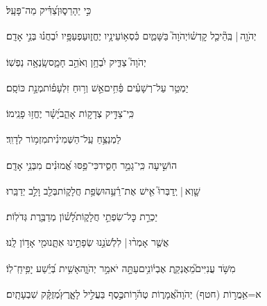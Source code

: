 \documentclass[12pt]{article}
\newcommand{\loc}[1]{\textsuperscript{\locf{#1}}}
\begin{document}
{\loc{ ג}~}‏כִּ֣י  יֵהָרֵס֑וּן{\hfill}צַ֝דִּ֗יק מַה־פָּעָֽל׃\par

{\loc{ ד}~}‏יְהֹוָ֤ה |  בְּֽהֵ֘יכַ֤ל קׇדְשׁ֗וֹ{\hfill}יְהֹוָה֮ בַּשָּׁמַ֢יִם כִּ֫סְא֥וֹ\newline\hspace*{.5em}עֵינָ֥יו יֶחֱז֑וּ{\hfill}עַפְעַפָּ֥יו יִ֝בְחֲנ֗וּ בְּנֵ֣י אָדָֽם׃\par

{\loc{ ה}~}‏יְהֹוָה֮ צַדִּ֢יק יִ֫בְחָ֥ן{\hfill} וְאֹהֵ֣ב חָמָ֑ס{\hfill}שָֽׂנְאָ֥ה נַפְשֽׁוֹ׃\par

{\loc{ ו}~}‏יַמְטֵ֥ר עַל־רְשָׁעִ֗ים פַּ֫חִ֥ים{\hfill}אֵ֣שׁ  וְר֥וּחַ זִלְעָפ֗וֹת{\hfill}מְנָ֣ת כּוֹסָֽם׃\par

{\loc{ ז}~}‏כִּֽי־צַדִּ֣יק  צְדָק֣וֹת אָהֵ֑ב{\hfill}יָ֝שָׁ֗ר יֶחֱז֥וּ פָנֵֽימוֹ׃\par\pend

\pstart[\subsection*{\textcolor{red}{פרק יב}}]\label{פרק יב}
{\loc{ א}~}‏לַמְנַצֵּ֥חַ עַֽל־הַשְּׁמִינִ֗ית{\hfill}מִזְמ֥וֹר לְדָוִֽד׃\par

{\loc{ ב}~}‏הוֹשִׁ֣יעָה  כִּֽי־גָמַ֣ר חָסִ֑יד{\hfill}כִּי־פַ֥סּוּ אֱ֝מוּנִ֗ים מִבְּנֵ֥י אָדָֽם׃\par

{\loc{ ג}~}‏שָׁ֤וְא |  יְֽדַבְּרוּ֮ אִ֤ישׁ אֶת־רֵ֫עֵ֥הוּ{\hfill}שְׂפַ֥ת חֲלָק֑וֹת{\hfill}בְּלֵ֖ב וָלֵ֣ב יְדַבֵּֽרוּ׃\par

{\loc{ ד}~}‏יַכְרֵ֣ת  כׇּל־שִׂפְתֵ֣י חֲלָק֑וֹת{\hfill}לָ֝שׁ֗וֹן מְדַבֶּ֥רֶת גְּדֹלֽוֹת׃\par

{\loc{ ה}~}‏אֲשֶׁ֤ר אָמְר֨וּ |  לִלְשֹׁנֵ֣נוּ {\hfill}שְׂפָתֵ֣ינוּ אִתָּ֑נוּ{\hfill}מִ֖י אָד֣וֹן לָֽנוּ׃\par

{\loc{ ו}~}‏מִשֹּׁ֥ד עֲנִיִּים֮{\hfill}מֵאֶנְקַ֢ת אֶבְי֫וֹנִ֥ים\newline\hspace*{.5em}עַתָּ֣ה  יֹאמַ֣ר יְהֹוָ֑ה{\hfill}אָשִׁ֥ית בְּ֝יֵ֗שַׁע יָפִ֥יחַֽ־לֽוֹ׃\par

{\loc{ ז}~}‏א=אִ֥מֲר֣וֹת (חטף) יְהֹוָה֮{\hfill}אֲמָר֢וֹת טְהֹ֫ר֥וֹת\newline\hspace*{.5em}כֶּ֣סֶף  בַּעֲלִ֣יל לָאָ֑רֶץ{\hfill}מְ֝זֻקָּ֗ק שִׁבְעָתָֽיִם׃\par
\end{document}
